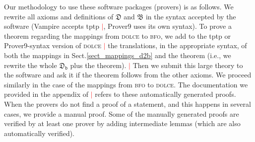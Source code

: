 \documentclass[ao]{iosart2x}
\newcommand{\nb}[1]{\textcolor{red}{$|$}\marginpar{\hspace*{-0cm}\parbox{20mm}{\scriptsize\raggedright\textcolor{red}{#1}}}}
\newcommand{\dolce}{{\textsc{dolce}}}
\newcommand{\bfo}{{\textsc{bfo}}}
\newcommand {\thdolce} {\ensuremath{\mathfrak{D}}}
\newcommand {\thbfo} {\ensuremath{\mathfrak{B}}}
\newcommand {\thdolcedbmap} {\ensuremath{\mathfrak{D}_\texttt{b}}}
\begin{document}

Our methodology to use these software packages (provers) is as follows. We rewrite all axioms and definitions of {$\thdolce$} and $\thbfo$ in the syntax accepted by the software (Vampire accepts tptp \citep{Sut16}\nb{CM: saltato riferimento, @Francesco, puoi aggiungre? FC:cambiato}, Prover9 uses its own syntax).
To prove a theorem regarding the mappings from {\dolce} to {\bfo}, we add to the tptp or Prover9-syntax version of {\dolce} \nb{CM: non ho capito di che rewriting si tratta} the translations, in the appropriate syntax, of both the mappings in Sect.\ref{sect_mappings_d2b} and the theorem (i.e., we rewrite the whole $\thdolcedbmap$ plus the theorem). 
\nb{FC: non mi ricordo di aver scritto la vecchia frase. Comunque non è corretta: solo alcuni teoremi soon stati dimostrati a mano prima di sottoporli al prover. Ho riscritto e commentato la vecchia versione} 
Then we submit this large theory to the software and ask it if the theorem follows from the other axioms. 
We proceed similarly in the case of the mappings from {\bfo} to {\dolce}. The documentation we provided in the appendix of \cite{D24}\nb{CM: che cosa sarebbe? FC: tipo l'appendice del deliverable di ontocommons, oppure citare quello: ho citato D24, in caso aggiungere link a appendice} refers to these automatically generated proofs.
When the provers do not find a proof of a statement, and this happens in several cases, we provide a manual proof. Some of the manually generated proofs are verified by at least one prover by adding intermediate lemmas (which are also automatically verified). %
\end{document}
